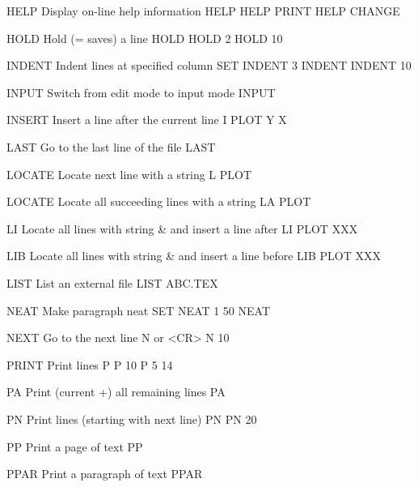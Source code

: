 HELP      Display on-line help information            HELP
                                                      HELP PRINT
                                                      HELP CHANGE
 
HOLD      Hold (= saves) a line                       HOLD
                                                      HOLD 2
                                                      HOLD 10
 
INDENT    Indent lines at specified column            SET INDENT 3
                                                      INDENT
                                                      INDENT 10
 
INPUT     Switch from edit mode to input mode         INPUT
 
INSERT    Insert a line after the current line        I PLOT Y X
 
LAST      Go to the last line of the file             LAST
 
LOCATE    Locate next line with a string              L PLOT
 
LOCATE    Locate all succeeding lines with a string   LA PLOT
 
LI        Locate all lines with string & and
          insert a line after                         LI PLOT XXX
 
LIB       Locate all lines with string & and
          insert a line before                        LIB PLOT XXX
 
 
LIST      List an external file                       LIST ABC.TEX
 
NEAT      Make paragraph neat                         SET NEAT 1 50
                                                      NEAT
 
NEXT      Go to the next line                         N
                                                      or <CR>
                                                      N 10
 
PRINT     Print lines                                 P
                                                      P 10
                                                      P 5 14
 
PA        Print (current +) all remaining lines       PA
 
PN        Print lines (starting with next line)       PN
                                                      PN 20
 
PP        Print a page of text                        PP
 
PPAR      Print a paragraph of text                   PPAR
 
